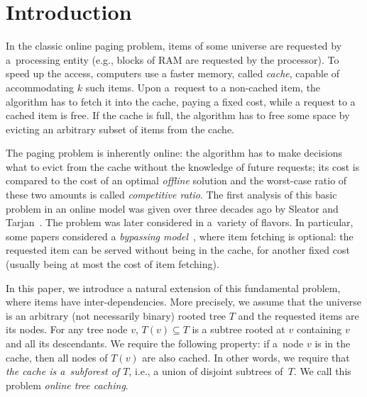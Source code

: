 \documentclass[sigconf,screen=true]{acmart}
\begin{document}
\renewcommand{\shortauthors}{M.~Bienkowski, J.~Marcinkowski, M.~Pacut, S.~Schmid, and A.~Spyra}



\section{Introduction}

In the classic online paging problem, items of some universe are requested by
a~processing entity (e.g., blocks of RAM are requested by the processor). To
speed up the access, computers use a faster memory, called
\emph{cache}, capable of accommodating $k$ such items. Upon a~request to a
non-cached item, the algorithm has to fetch it into the cache, paying a fixed
cost, while a request to a cached item is free. If the cache is full, the
algorithm has to free some space by evicting an arbitrary subset of items from
the cache.

The paging problem is inherently online: the algorithm has to make decisions
what to evict from the cache without the knowledge of future requests; its
cost is compared to the cost of an optimal \emph{offline} solution and the
worst-case ratio of these two amounts is called \emph{competitive ratio}. The first
analysis of this basic problem in an online model was given over three
decades ago by Sleator and Tarjan~\cite{competitive-analysis}. The problem was later
considered in a~variety of flavors. In particular, some papers considered a
\emph{bypassing model}~\cite{caching-rejection-penalties,paging-irani}, where
item fetching is optional: the requested item can be served without being in
the cache, for another fixed cost (usually being at most the cost of item
fetching).

In this paper, we introduce a natural extension of this fundamental problem, where
items have inter-de\-pen\-den\-cies. More precisely, we assume that the universe is
an arbitrary (not necessarily binary) rooted tree $T$ and the requested items
are its nodes. For any tree node $v$, $T(v) \subseteq T$ is a subtree rooted
at $v$ containing $v$ and all its descendants. We require the following
property: if a~node $v$ is in the cache, then all nodes of $T(v)$ are also
cached. In other words, we require that \emph{the cache is a~subforest of
$T$}, i.e., a union of disjoint subtrees of~$T$.  We call this problem
\emph{online tree caching}.
\end{document}
